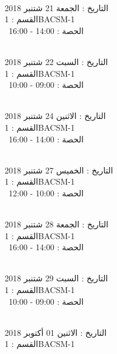 \noindent\makebox[\linewidth]{\rule{\paperwidth}{0.4pt}}
 \\
التاريخ : الجمعة 21 شتنبر 2018 \\
القسم : 1BACSM-1 \\
 \  
الحصة : 14:00 - 16:00 \\
\par
\noindent\makebox[\linewidth]{\rule{\paperwidth}{0.4pt}}
 \\
التاريخ : السبت 22 شتنبر 2018 \\
القسم : 1BACSM-1 \\
 \  
الحصة : 09:00 - 10:00 \\
\par
\noindent\makebox[\linewidth]{\rule{\paperwidth}{0.4pt}}
 \\
التاريخ : الاثنين 24 شتنبر 2018 \\
القسم : 1BACSM-1 \\
 \  
الحصة : 14:00 - 16:00 \\
\par
\noindent\makebox[\linewidth]{\rule{\paperwidth}{0.4pt}}
 \\
التاريخ : الخميس 27 شتنبر 2018 \\
القسم : 1BACSM-1 \\
 \  
الحصة : 10:00 - 12:00 \\
\par
\noindent\makebox[\linewidth]{\rule{\paperwidth}{0.4pt}}
 \\
التاريخ : الجمعة 28 شتنبر 2018 \\
القسم : 1BACSM-1 \\
 \  
الحصة : 14:00 - 16:00 \\
\par
\noindent\makebox[\linewidth]{\rule{\paperwidth}{0.4pt}}
 \\
التاريخ : السبت 29 شتنبر 2018 \\
القسم : 1BACSM-1 \\
 \  
الحصة : 09:00 - 10:00 \\
\par
\noindent\makebox[\linewidth]{\rule{\paperwidth}{0.4pt}}
 \\
التاريخ : الاثنين 01 أكتوبر 2018 \\
القسم : 1BACSM-1 \\
